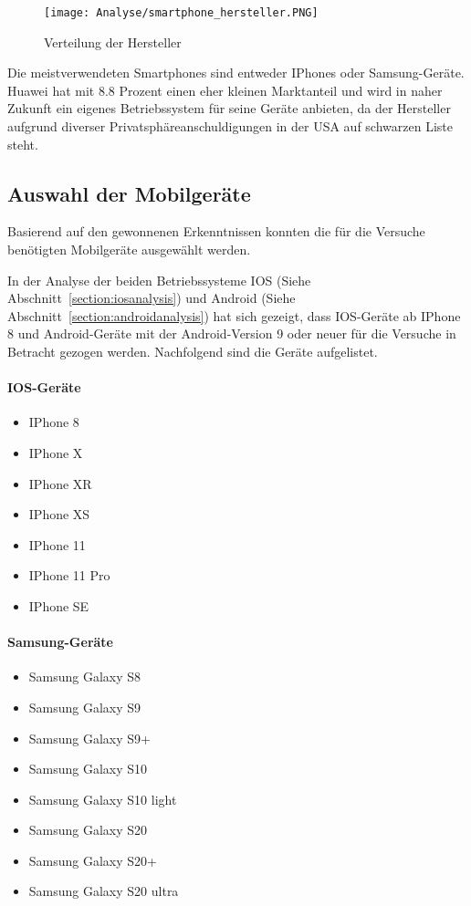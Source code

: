 \begin{figure}[h!]
    \centering
    \texttt{[image: Analyse/smartphone\_hersteller.PNG]}
    \caption{Verteilung der Hersteller}
    \label{figure:SmartphoneHersteller}
\end{figure}

Die meistverwendeten Smartphones sind entweder IPhones oder Samsung-Geräte.
Huawei hat mit $8.8$ Prozent einen eher kleinen Marktanteil und wird in naher Zukunft
ein eigenes Betriebssystem für seine Geräte anbieten, da der Hersteller 
aufgrund diverser Privatsphäreanschuldigungen in der USA auf schwarzen Liste 
steht. 

\clearpage

\subsection{Auswahl der Mobilgeräte}
Basierend auf den gewonnenen Erkenntnissen konnten die für die Versuche
benötigten Mobilgeräte ausgewählt werden.

In der Analyse der beiden Betriebssysteme IOS 
(Siehe Abschnitt~\ref{section:iosanalysis}) und Android
(Siehe Abschnitt~\ref{section:androidanalysis}) hat sich gezeigt, dass
IOS-Geräte ab IPhone 8 und Android-Geräte mit der Android-Version 9 oder neuer
für die Versuche in Betracht gezogen werden. 
Nachfolgend sind die Geräte aufgelistet.

\paragraph{IOS-Geräte}
\begin{itemize}
    \item IPhone 8
    \item IPhone X
    \item IPhone XR
    \item IPhone XS
    \item IPhone 11
    \item IPhone 11 Pro
    \item IPhone SE
\end{itemize}

\paragraph{Samsung-Geräte}
\begin{itemize}
    \item Samsung Galaxy S8
    \item Samsung Galaxy S9
    \item Samsung Galaxy S9+
    \item Samsung Galaxy S10
    \item Samsung Galaxy S10 light
    \item Samsung Galaxy S20
    \item Samsung Galaxy S20+
    \item Samsung Galaxy S20 ultra
\end{itemize}

